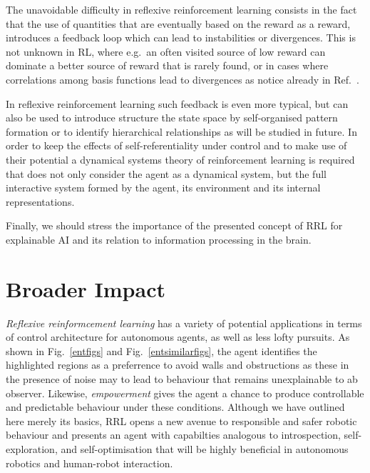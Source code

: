 \documentclass{article}
\begin{document}
The unavoidable difficulty in reflexive reinforcement learning consists in the 
fact that the use of quantities that are eventually based on the reward as a
reward, introduces a feedback loop which can lead to instabilities or divergences. This is not unknown in RL, where e.g.~an often visited source of low reward can dominate a better source of reward that is rarely found, or in cases where correlations among basis functions lead to divergences as notice already in Ref.~\citep{baird1995residual}. 

In reflexive reinforcement learning such 
feedback is even more typical, but can also be used to introduce structure the 
state space by self-organised pattern formation or to identify hierarchical 
relationships as will be studied in future. In order to keep the effects of 
self-referentiality under control and to make use of their potential
a dynamical systems theory of reinforcement learning is required that 
does not only consider the agent as a dynamical system, but the full interactive 
system formed by the agent, its environment and its internal representations.

Finally, we should stress the importance of the presented concept of RRL for explainable AI and its relation to information processing in the brain.

\section*{Broader Impact}

\emph{Reflexive reinformcement learning}
has a variety of potential applications in terms of control architecture for autonomous agents, as well as less lofty pursuits. 
As shown in Fig.~\ref{entfigs} and Fig.~\ref{entsimilarfigs}, the agent identifies the 
highlighted regions as a preferrence to avoid walls and obstructions as these in the presence of
noise may to lead to behaviour that remains unexplainable to ab observer. Likewise, \emph{empowerment} gives the agent a chance to produce controllable and predictable behaviour under these conditions. Although we have outlined here merely its basics,  RRL opens a new avenue to responsible and safer robotic behaviour and presents an agent with capabilties analogous to introspection, self-exploration, and self-optimisation that will be highly beneficial in autonomous robotics and 
human-robot interaction.
\end{document}
